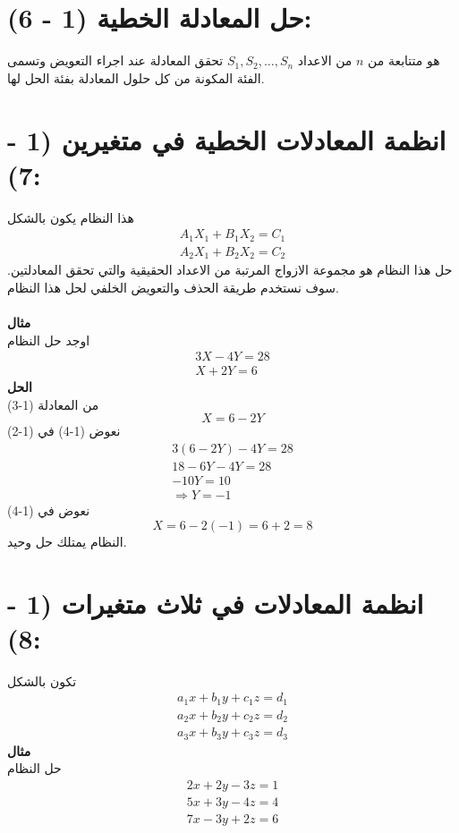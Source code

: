 \section*{حل المعادلة الخطية (1 - 6):}
هو متتابعة من $n$ من الاعداد $S_1,S_2,\dots,S_n$ تحقق المعادلة عند اجراء التعويض وتسمى الفئة المكونة من كل  حلول المعادلة بفئة الحل لها.

\section*{انظمة المعادلات الخطية في متغيرين (1 - 7):}
هذا النظام يكون بالشكل
\begin{gather*}
	A_1 X_1 + B_1X_2 = C_1\\
	A_2 X_1 + B_2 X_2 = C_2
\end{gather*}
حل هذا النظام هو مجموعة الازواج المرتبة من الاعداد الحقيقية والتي تحقق المعادلتين. سوف نستخدم طريقة الحذف والتعويض الخلفي لحل هذا النظام.\\
\\
\noindent
\textbf{مثال}
\\ \noindent
	اوجد حل النظام
	\begin{gather}
		3X - 4Y = 28\\
		X+2Y = 6
	\end{gather}
	\noindent
	\textbf{الحل}\\
	\noindent
	من المعادلة (1-3)
	\begin{equation}
		X = 6 -2Y
	\end{equation}
	نعوض (1-4) في (1-2)
	\begin{gather*}
		3(6-2Y) - 4Y = 28\\
		18 - 6Y - 4Y = 28\\
		-10 Y = 10\\
		\Rightarrow Y = -1
	\end{gather*}
	نعوض في (1-4)
	\[
	X = 6-2(-1) = 6+2 = 8
	\] 
	النظام يمتلك حل وحيد.

\section*{انظمة المعادلات في ثلاث متغيرات (1 - 8):}
تكون بالشكل
\begin{gather*}
	a_1 x + b_1 y + c_1 z = d_1\\
	a_2 x + b_2 y + c_2 z = d_2\\
	a_3 x + b_3 y + c_3 z = d_3
\end{gather*}
\noindent
\textbf{مثال}\\ \noindent
	حل النظام
	\begin{gather}
		2x + 2y - 3z = 1\\
	5x + 3y - 4z = 4 \\
	7x - 3y + 2z =6
	\end{gather}
	
